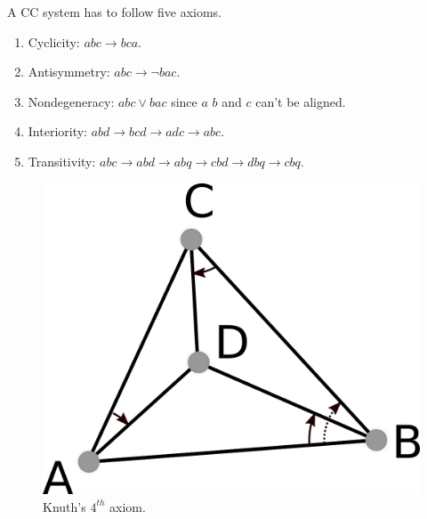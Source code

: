 \documentclass[18pt]{beamer}
\begin{document}
\begin{frame}

 A CC system has to follow five axioms.
\begin{enumerate}
\item<1-> Cyclicity: $abc \rightarrow bca$.
\item<2-> Antisymmetry: $abc\rightarrow \neg bac$.
\item<3-> Nondegeneracy: $abc \vee bac$ since $a$ $b$ and $c$ can't be aligned.
\item<4-> Interiority: $abd \rightarrow bcd \rightarrow adc \rightarrow abc$.
\item<5-> Transitivity: $ abc \rightarrow abd \rightarrow abq \rightarrow cbd \rightarrow dbq \rightarrow cbq $.
\end{enumerate}

\begin{overprint}
\begin{figure}
  \centering
  \includegraphics[scale=1.5]{Axiom4}
  \caption{Knuth's $4^{th}$ axiom.}
\end{figure}


\end{overprint}
\end{frame}
\end{document}
